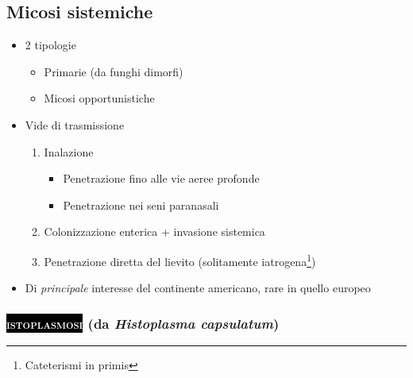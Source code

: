 \documentclass[italian,]{article}
\providecommand{\tightlist}{%
  \setlength{\itemsep}{0pt}\setlength{\parskip}{0pt}}
\newcommand{\pat}[1]{\colorbox{black}{\textcolor{white}{\textsc{#1}}}}
\begin{document}
\hypertarget{micosi-sistemiche}{%
\subsection{Micosi sistemiche}\label{micosi-sistemiche}}

\begin{itemize}
\tightlist
\item
  2 tipologie

  \begin{itemize}
  \tightlist
  \item
    Primarie (da funghi dimorfi)
  \item
    Micosi opportunistiche
  \end{itemize}
\item
  Vide di trasmissione

  \begin{enumerate}
  \def\labelenumi{\arabic{enumi}.}
  \tightlist
  \item
    Inalazione

    \begin{itemize}
    \tightlist
    \item
      Penetrazione fino alle vie aeree profonde
    \item
      Penetrazione nei seni paranasali
    \end{itemize}
  \item
    Colonizzazione enterica + invasione sistemica
  \item
    Penetrazione diretta del lievito (solitamente iatrogena\footnote{Cateterismi
      in primis})
  \end{enumerate}
\item
  Di \emph{principale} interesse del continente americano, rare in
  quello europeo
\end{itemize}

\hypertarget{da-histoplasma-capsulatum}{%
\subsubsection{\texorpdfstring{\pat{istoplasmosi} (da \emph{Histoplasma
capsulatum})}{ (da Histoplasma capsulatum)}}\label{da-histoplasma-capsulatum}}
\end{document}
